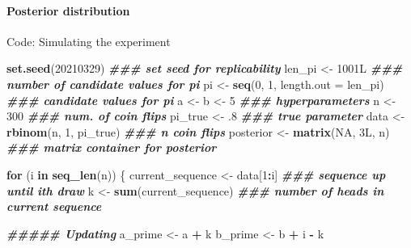 \documentclass[
  11pt,
]{article}
\newenvironment{Shaded}{\begin{snugshade}}{\end{snugshade}}
\newcommand{\AttributeTok}[1]{\textcolor[rgb]{0.13,0.29,0.53}{#1}}
\newcommand{\ConstantTok}[1]{\textcolor[rgb]{0.56,0.35,0.01}{#1}}
\newcommand{\ControlFlowTok}[1]{\textcolor[rgb]{0.13,0.29,0.53}{\textbf{#1}}}
\newcommand{\DecValTok}[1]{\textcolor[rgb]{0.00,0.00,0.81}{#1}}
\newcommand{\DocumentationTok}[1]{\textcolor[rgb]{0.56,0.35,0.01}{\textbf{\textit{#1}}}}
\newcommand{\FunctionTok}[1]{\textcolor[rgb]{0.13,0.29,0.53}{\textbf{#1}}}
\newcommand{\NormalTok}[1]{#1}
\newcommand{\OtherTok}[1]{\textcolor[rgb]{0.56,0.35,0.01}{#1}}
\newcommand{\SpecialCharTok}[1]{\textcolor[rgb]{0.81,0.36,0.00}{\textbf{#1}}}
\begin{document}
\hypertarget{posterior-distribution-1}{%
\paragraph{Posterior distribution}\label{posterior-distribution-1}}

Code: Simulating the experiment

\begin{Shaded}
\begin{Highlighting}[]
\FunctionTok{set.seed}\NormalTok{(}\DecValTok{20210329}\NormalTok{)                   }\DocumentationTok{\#\#\# set seed for replicability}
\NormalTok{len\_pi }\OtherTok{\textless{}{-}}\NormalTok{ 1001L                      }\DocumentationTok{\#\#\# number of candidate values for pi}
\NormalTok{pi }\OtherTok{\textless{}{-}} \FunctionTok{seq}\NormalTok{(}\DecValTok{0}\NormalTok{, }\DecValTok{1}\NormalTok{, }\AttributeTok{length.out =}\NormalTok{ len\_pi) }\DocumentationTok{\#\#\# candidate values for pi}
\NormalTok{a }\OtherTok{\textless{}{-}}\NormalTok{ b }\OtherTok{\textless{}{-}} \DecValTok{5}                          \DocumentationTok{\#\#\# hyperparameters}
\NormalTok{n }\OtherTok{\textless{}{-}} \DecValTok{300}                             \DocumentationTok{\#\#\# num. of coin flips}
\NormalTok{pi\_true }\OtherTok{\textless{}{-}}\NormalTok{ .}\DecValTok{8}                        \DocumentationTok{\#\#\# true parameter}
\NormalTok{data }\OtherTok{\textless{}{-}} \FunctionTok{rbinom}\NormalTok{(n, }\DecValTok{1}\NormalTok{, pi\_true)        }\DocumentationTok{\#\#\# n coin flips}
\NormalTok{posterior }\OtherTok{\textless{}{-}} \FunctionTok{matrix}\NormalTok{(}\ConstantTok{NA}\NormalTok{, 3L, n)       }\DocumentationTok{\#\#\# matrix container for posterior}

\ControlFlowTok{for}\NormalTok{ (i }\ControlFlowTok{in} \FunctionTok{seq\_len}\NormalTok{(n)) \{    }
\NormalTok{  current\_sequence }\OtherTok{\textless{}{-}}\NormalTok{ data[}\DecValTok{1}\SpecialCharTok{:}\NormalTok{i]      }\DocumentationTok{\#\#\# sequence up until ith draw}
\NormalTok{  k }\OtherTok{\textless{}{-}} \FunctionTok{sum}\NormalTok{(current\_sequence)         }\DocumentationTok{\#\#\# number of heads in current sequence}
  
  \DocumentationTok{\#\#\#\#\# Updating}
\NormalTok{  a\_prime }\OtherTok{\textless{}{-}}\NormalTok{ a }\SpecialCharTok{+}\NormalTok{ k               }
\NormalTok{  b\_prime }\OtherTok{\textless{}{-}}\NormalTok{ b }\SpecialCharTok{+}\NormalTok{ i }\SpecialCharTok{{-}}\NormalTok{ k}
  

\end{Highlighting}
\end{Shaded}
\end{document}
